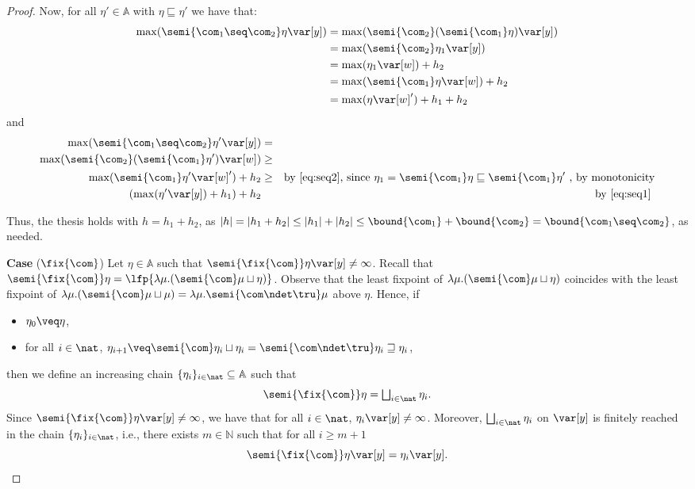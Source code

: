\begin{proof}
  Now, for all \(\eta' \in \mathbb{A}\) with \(\eta \sqsubseteq \eta'\) we have that:
  \begin{align*}
    \max(\semi{\com_1 \seq \com_2}\eta \var[y])
    &= \max(\semi{\com_2}(\semi{\com_1}\eta) \var[y])\\
    & = \max(\semi{\com_2}\eta_1 \var[y])\\
    & = \max(\eta_1 \var[w]) + h_2\\
    & = \max(\semi{\com_1}\eta \var[w]) + h_2\\
    &= \max(\eta \var[w]')+h_1 + h_2
  \end{align*}
  and
  \begin{align*}
    \max(\semi{\com_1 \seq \com_2}\eta' \var[y]) & = & \\ 
    \max(\semi{\com_2}(\semi{\com_1}\eta') \var[w]) & \geq & \\ 
    \max(\semi{\com_1}\eta' \var[w]') + h_2 & \geq & 
    \text{by \eqref{eq:seq2}, since } \eta_1 = \semi{\com_1}\eta \sqsubseteq \semi{\com_1}\eta' \text{ , by monotonicity} \\
    (\max(\eta' \var[y]) +h_1) + h_2 & & \text{by \eqref{eq:seq1}}\
  \end{align*}

  Thus, the thesis holds with \(h= h_1+h_2\), as
  \(|h| =|h_1 +h_2| \leq |h_1| + |h_2| \leq \bound{\com_1} +
  \bound{\com_2} = \bound{\com_1 \seq \com_2}\), as needed.



  
  \medskip
  
  \noindent
  \textbf{Case} (\(\fix{\com}\)) 
  Let \(\eta \in \mathbb{A}\) such that
  \(\semi{\fix{\com}} \eta \var[y] \neq \infty\). Recall that
  \(\semi{\fix{\com}} \eta = \lfp{\lambda \mu. (\semi{\com}
    \mu \sqcup\eta)}\). Observe that the least fixpoint of
  \(\lambda \mu. (\semi{\com}
  \mu \sqcup\eta)\) coincides with the least
  fixpoint of
  \(\lambda \mu. (\semi{\com} \mu  \sqcup \mu) = \lambda \mu. \semi{ \com\ndet \tru} \mu\) above \(\eta\). Hence, if
  \begin{itemize}
  \item \(\eta_0 \veq \eta\),
  \item for all \(i\in \nat\),
    \(\eta_{i+1} \veq \semi{\com} \eta_i \sqcup \eta_i= \semi{\com \ndet
    \tru} \eta_i \sqsupseteq \eta_i\),
  \end{itemize}
  then we define an increasing chain \(\{\eta_i\}_{i\in \nat}\subseteq \mathbb{A}\) such that
  \[ 
  \semi{\fix{\com}} \eta = \textstyle\bigsqcup_{i \in \nat} \eta_i.
  \]
  Since \(\semi{\fix{\com}} \eta \var[y] \neq \infty\), we have that
  for all \(i\in \nat\), \(\eta_i \var[y] \neq \infty\). Moreover,
  \(\textstyle\bigsqcup_{i \in \nat} \eta_i\) on \(\var[y]\) is
  finitely reached in the chain \(\{\eta_i\}_{i\in \nat}\), i.e.,
  there exists \(m \in \mathbb{N}\) such that for all \(i \geq m+1\)
  \[
  \semi{\fix{\com}} \eta \var[y] = \eta_{i} \var[y].
  \]


\end{proof}

